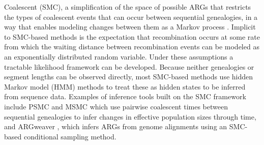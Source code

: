 \documentclass[11pt]{article}
\begin{document}
Coalescent (SMC), a simplification of the space of possible ARGs that 
restricts the types of coalescent events that can occur between sequential
genealogies, in a way that enables modeling 
changes between
them as a Markov process 
\citep{mcvean2005approximating}. 
Implicit to SMC-based methods is the expectation that recombination occurs at 
some rate from which the waiting distance between recombination events can be modeled 
as an exponentially distributed random variable. 
Under these assumptions a tractable likelihood framework can be developed. 
% 
% 
Because neither genealogies or segment lengths can
be observed directly, most SMC-based methods use 
hidden Markov model (HMM) methods to treat these as hidden states to
be inferred from sequence data. 
Examples of inference tools built on the SMC framework include 
PSMC \citep{li2011inference} and MSMC \citep{schiffels_inferring_2014}
which use pairwise coalescent times between sequential genealogies
to infer changes in effective population sizes through time, 
and ARGweaver \citep{rasmussen2014genome, hubisz2020inference}, 
which infers ARGs from genome alignments using an SMC-based 
conditional sampling method.
\end{document}
